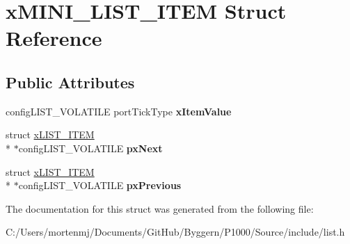 \hypertarget{structx_m_i_n_i___l_i_s_t___i_t_e_m}{\section{x\-M\-I\-N\-I\-\_\-\-L\-I\-S\-T\-\_\-\-I\-T\-E\-M Struct Reference}
\label{structx_m_i_n_i___l_i_s_t___i_t_e_m}
}
\subsection*{Public Attributes}
\begin{DoxyCompactItemize}
\item 
\hypertarget{structx_m_i_n_i___l_i_s_t___i_t_e_m_a15a3f1840e5f2a5f59c7f06a355f6e82}{config\-L\-I\-S\-T\-\_\-\-V\-O\-L\-A\-T\-I\-L\-E port\-Tick\-Type {\bfseries x\-Item\-Value}}\label{structx_m_i_n_i___l_i_s_t___i_t_e_m_a15a3f1840e5f2a5f59c7f06a355f6e82}

\item 
\hypertarget{structx_m_i_n_i___l_i_s_t___i_t_e_m_aa7ae770b0f10daeb9ac76c6f7dd5608e}{struct \hyperlink{structx_l_i_s_t___i_t_e_m}{x\-L\-I\-S\-T\-\_\-\-I\-T\-E\-M} \\*
$\ast$config\-L\-I\-S\-T\-\_\-\-V\-O\-L\-A\-T\-I\-L\-E {\bfseries px\-Next}}\label{structx_m_i_n_i___l_i_s_t___i_t_e_m_aa7ae770b0f10daeb9ac76c6f7dd5608e}

\item 
\hypertarget{structx_m_i_n_i___l_i_s_t___i_t_e_m_a732c666bb97560eb1b094a2c411269ab}{struct \hyperlink{structx_l_i_s_t___i_t_e_m}{x\-L\-I\-S\-T\-\_\-\-I\-T\-E\-M} \\*
$\ast$config\-L\-I\-S\-T\-\_\-\-V\-O\-L\-A\-T\-I\-L\-E {\bfseries px\-Previous}}\label{structx_m_i_n_i___l_i_s_t___i_t_e_m_a732c666bb97560eb1b094a2c411269ab}

\end{DoxyCompactItemize}


The documentation for this struct was generated from the following file\-:\begin{DoxyCompactItemize}
\item 
C\-:/\-Users/mortenmj/\-Documents/\-Git\-Hub/\-Byggern/\-P1000/\-Source/include/list.\-h\end{DoxyCompactItemize}
